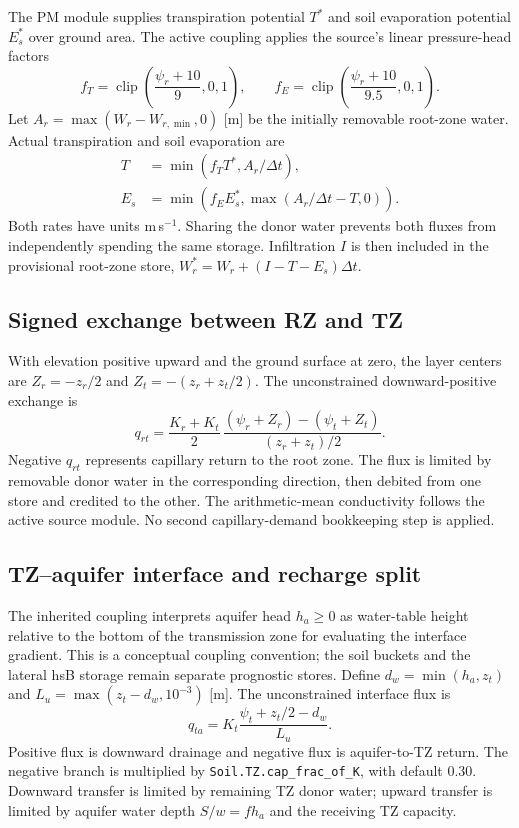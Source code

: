 The PM module supplies transpiration potential $T^*$ and soil evaporation potential $E_s^*$ over ground area. The active coupling applies the source's linear pressure-head factors
\begin{equation}
f_T=\operatorname{clip}\left(\frac{\psi_r+10}{9},0,1\right),\qquad
f_E=\operatorname{clip}\left(\frac{\psi_r+10}{9.5},0,1\right).
\end{equation}
Let $A_r=\max(W_r-W_{r,\min},0)$ [m] be the initially removable root-zone water. Actual transpiration and soil evaporation are
\begin{align}
T&=\min(f_T T^*,A_r/\Delta t),\label{eq:etrz_limit}\\
E_s&=\min\left(f_E E_s^*,\max(A_r/\Delta t-T,0)\right).\label{eq:esoil_limit}
\end{align}
Both rates have units m\,s$^{-1}$. Sharing the donor water prevents both fluxes from independently spending the same storage. Infiltration $I$ is then included in the provisional root-zone store, $W_r^*=W_r+(I-T-E_s)\Delta t$.

\subsection{Signed exchange between RZ and TZ}

With elevation positive upward and the ground surface at zero, the layer centers are $Z_r=-z_r/2$ and $Z_t=-(z_r+z_t/2)$. The unconstrained downward-positive exchange is
\begin{equation}
q_{rt}=\frac{K_r+K_t}{2}\,
\frac{(\psi_r+Z_r)-(\psi_t+Z_t)}{(z_r+z_t)/2}.
\end{equation}
Negative $q_{rt}$ represents capillary return to the root zone. The flux is limited by removable donor water in the corresponding direction, then debited from one store and credited to the other. The arithmetic-mean conductivity follows the active source module. No second capillary-demand bookkeeping step is applied.

\subsection{TZ--aquifer interface and recharge split}

The inherited coupling interprets aquifer head $h_a\ge0$ as water-table height relative to the bottom of the transmission zone for evaluating the interface gradient. This is a conceptual coupling convention; the soil buckets and the lateral hsB storage remain separate prognostic stores. Define $d_w=\min(h_a,z_t)$ and $L_u=\max(z_t-d_w,10^{-3})$ [m]. The unconstrained interface flux is
\begin{equation}
q_{ta}=K_t\frac{\psi_t+z_t/2-d_w}{L_u}.
\end{equation}
Positive flux is downward drainage and negative flux is aquifer-to-TZ return. The negative branch is multiplied by \texttt{Soil.TZ.cap\_frac\_of\_K}, with default 0.30. Downward transfer is limited by remaining TZ donor water; upward transfer is limited by aquifer water depth $S/w=fh_a$ and the receiving TZ capacity.

